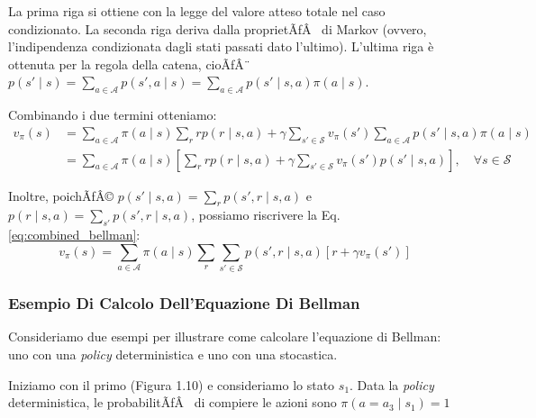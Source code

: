 ﻿\documentclass[11pt, a4paper]{report}
\begin{document}
La prima riga si ottiene con la legge del valore atteso totale nel caso condizionato. La seconda riga deriva dalla proprietÃƒÂ  di Markov (ovvero, l'indipendenza condizionata dagli stati passati dato l'ultimo). L'ultima riga è ottenuta per la regola della catena, cioÃƒÂ¨ $p(s' \mid s) = \sum_{a \in \mathcal{A}} p(s', a \mid s) = \sum_{a \in \mathcal{A}} p(s' \mid s, a)\pi(a \mid s)$.

Combinando i due termini otteniamo:
\begin{equation}
\begin{aligned}
v_\pi(s) &= \sum_{a \in \mathcal{A}} \pi(a \mid s) \sum_r r p(r \mid s, a) + \gamma \sum_{s' \in \mathcal{S}} v_\pi(s') \sum_{a \in \mathcal{A}} p(s' \mid s, a)\pi(a \mid s) \\
&= \sum_{a \in \mathcal{A}} \pi(a \mid s) \left[ \sum_r r p(r \mid s, a) + \gamma \sum_{s' \in \mathcal{S}} v_\pi(s') p(s' \mid s, a) \right], \quad \forall s \in \mathcal{S}
\end{aligned}
\end{equation}

Inoltre, poichÃƒÂ© $p(s' \mid s, a) = \sum_r p(s', r \mid s, a)$ e $p(r \mid s, a) = \sum_{s'} p(s', r \mid s, a)$, possiamo riscrivere la Eq. \eqref{eq:combined_bellman}:
\begin{equation}
v_\pi(s) = \sum_{a \in \mathcal{A}} \pi(a \mid s) \sum_r \sum_{s' \in \mathcal{S}} p(s', r \mid s, a) [r + \gamma v_\pi(s')]
\end{equation}

\subsubsection{Esempio Di Calcolo Dell'Equazione Di Bellman}

Consideriamo due esempi per illustrare come calcolare l'equazione di Bellman: uno con una \emph{policy} deterministica e uno con una stocastica.

Iniziamo con il primo (Figura 1.10) e consideriamo lo stato $s_1$. Data la \emph{policy} deterministica, le probabilitÃƒÂ  di compiere le azioni sono $\pi(a = a_3 \mid s_1) = 1$

\newpage


\newpage
\end{document}
